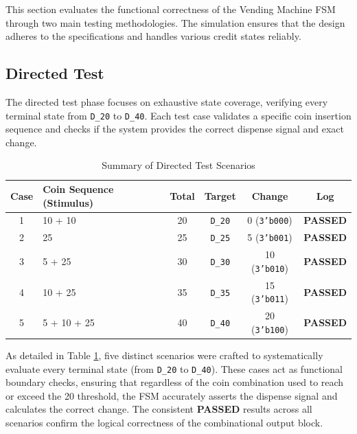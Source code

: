 This section evaluates the functional correctness of the Vending Machine FSM through two main testing methodologies. The simulation ensures that the design adheres to the specifications and handles various credit states reliably.

\subsection{Directed Test}
The directed test phase focuses on exhaustive state coverage, verifying every terminal state from \texttt{D\_20} to \texttt{D\_40}. Each test case validates a specific coin insertion sequence and checks if the system provides the correct dispense signal and exact change.

\begin{table}[H]
	\centering
	\small %

	\label{tab:directed_tests}
	\renewcommand{\arraystretch}{1.5}
	\begin{tabularx}{\textwidth}{|c|X|c|c|c|c|}
		\hline
		\textbf{Case} & \textbf{Coin Sequence (Stimulus)} & \textbf{Total} & \textbf{Target} & \textbf{Change} & \textbf{Log} \\ \hline
		1 & 10\textcent{} + 10\textcent{} & 20\textcent{} & \texttt{D\_20} & 0\textcent{} (\texttt{3'b000}) & \textbf{PASSED} \\ \hline
		2 & 25\textcent{} & 25\textcent{} & \texttt{D\_25} & 5\textcent{} (\texttt{3'b001}) & \textbf{PASSED} \\ \hline
		3 & 5\textcent{} + 25\textcent{} & 30\textcent{} & \texttt{D\_30} & 10\textcent{} (\texttt{3'b010}) & \textbf{PASSED} \\ \hline
		4 & 10\textcent{} + 25\textcent{} & 35\textcent{} & \texttt{D\_35} & 15\textcent{} (\texttt{3'b011}) & \textbf{PASSED} \\ \hline
		5 & 5\textcent{} + 10\textcent{} + 25\textcent{} & 40\textcent{} & \texttt{D\_40} & 20\textcent{} (\texttt{3'b100}) & \textbf{PASSED} \\ \hline
	\end{tabularx}
		\caption{Summary of Directed Test Scenarios}
\end{table}
As detailed in Table \ref{tab:directed_tests}, five distinct scenarios were crafted to systematically evaluate every terminal state (from \texttt{D\_20} to \texttt{D\_40}). These cases act as functional boundary checks, ensuring that regardless of the coin combination used to reach or exceed the 20\textcent{} threshold, the FSM accurately asserts the dispense signal and calculates the correct change. The consistent \textbf{PASSED} results across all scenarios confirm the logical correctness of the combinational output block.
